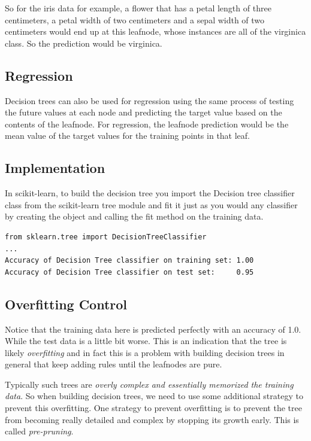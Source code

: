 \begin{multicols}{2}
So for the iris data for example, a flower that has a petal length of three centimeters, a petal width of two centimeters and a sepal width of two centimeters would end up at this leafnode, whose instances are all of the virginica class. So the prediction would be virginica. 

\subsection{Regression}

Decision trees can also be used for regression using the same process of testing the future values at each node and predicting the target value based on the contents of the leafnode. For regression, the leafnode prediction would be the mean value of the target values for the training points in that leaf. 

\subsection{Implementation}

In scikit-learn, to build the decision tree you import the Decision tree classifier class from the scikit-learn tree module and fit it just as you would any classifier by creating the object and calling the fit method on the training data. 

{\scriptsize
\begin{verbatim}
from sklearn.tree import DecisionTreeClassifier
...
Accuracy of Decision Tree classifier on training set: 1.00
Accuracy of Decision Tree classifier on test set:     0.95
\end{verbatim}
}

\subsection{Overfitting Control}

Notice that the training data here is predicted perfectly with an accuracy of 1.0. While the test data is a little bit worse. This is an indication that the tree is likely \emph{overfitting} and in fact this is a problem with building decision trees in general that keep adding rules until the leafnodes are pure. 

Typically such trees are \emph{overly complex and essentially memorized the training data}. So when building decision trees, we need to use some additional strategy to prevent this overfitting. One strategy to prevent overfitting is to prevent the tree from becoming really detailed and complex by stopping its growth early. This is called \emph{pre-pruning}. 


\end{multicols}
